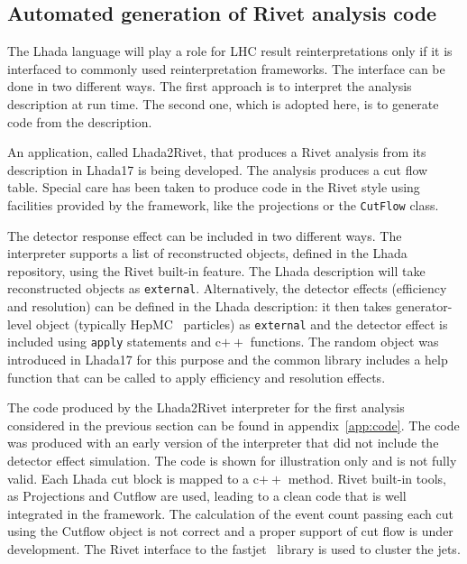 \documentclass[11pt]{cernrep}
\begin{document}
\subsection{Automated generation of Rivet analysis code}

The {\sc Lhada} language will play a role for LHC result reinterpretations only if it is interfaced to commonly used reinterpretation frameworks. The interface can be done in two different ways. The first approach is to interpret the analysis description at run time. The second one, which is adopted here, is to generate code from the description.

An application, called {\sc Lhada2Rivet}, that produces a Rivet analysis from its description in {\sc Lhada17} is being developed. The analysis produces a cut flow table. Special care has been taken to produce code in the {\sc Rivet} style using facilities provided by the framework, like the projections or the {\tt CutFlow} class.

The detector response effect can be included in two different ways. The interpreter supports a list of reconstructed objects, defined in the {\sc Lhada} repository, using the {\sc Rivet} built-in feature. The {\sc Lhada} description will take reconstructed objects as {\tt external}. Alternatively, the detector effects (efficiency and resolution) can be defined in the {\sc Lhada} description: it then takes generator-level object (typically {\sc HepMC}~\cite{Dobbs:2001ck} particles) as {\tt external} and the detector effect is included using {\tt apply} statements and c$++$ functions. The random object was introduced in {\sc Lhada17} for this purpose and the common library includes a help function that can be called to apply efficiency and resolution effects.

The code produced by the {\sc Lhada2Rivet} interpreter for the first analysis considered in the previous section can be found in appendix~\ref{app:code}. The code was produced with an early version of the interpreter that did not include the detector effect simulation. The code is shown for illustration only and is not fully valid. Each {\sc Lhada} cut block is mapped to a c$++$ method. {\sc Rivet} built-in tools, as Projections and Cutflow are used, leading to a clean code that is well integrated in the framework. The calculation of the event count passing each cut using the Cutflow object is not correct and a proper support of cut flow is under development.  The {\sc Rivet} interface to the fastjet~\cite{Cacciari:2011ma} library is used to cluster the jets.
\end{document}

